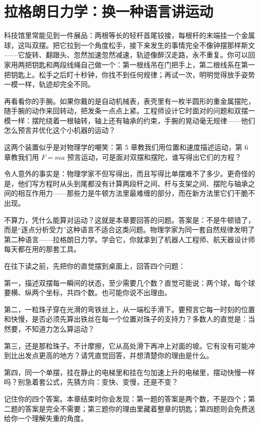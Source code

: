 \chapter{拉格朗日力学：换一种语言讲运动}


\begin{mainline}
科技馆里常能见到一件展品：两根等长的轻杆首尾铰接，每根杆的末端挂一个金属球，这叫双摆。把它拉到一个角度松手，接下来发生的事情完全不像钟摆那样斯文——它旋转、翻跟头、忽然加速忽然减速，轨迹像醉汉走路，永不重复。你可以回家用两把钥匙和两段线绳自己做一个：第一根线吊在门把手上，第二根线系在第一把钥匙上。松手之后盯十秒钟，你找不到任何规律；再试一次，明明觉得放手姿势一模一样，轨迹却完全不同。

再看看你的手腕。如果你戴的是自动机械表，表壳里有一枚半圆形的重金属摆陀，随手腕的动作来回转动，把发条一点点上紧。工程师设计它时面对的问题和双摆一模一样：摆陀绕着一根轴转，轴上还有轴承的约束，手腕的晃动毫无规律——他们怎么预言并优化这个小机器的运动？

这两个装置似乎是对物理学的嘲笑：第 5 章教我们用位置和速度描述运动，第 6 章教我们用 \(F=ma\) 预言运动，可是面对双摆和摆陀，谁写得出它们的方程？

令人意外的事实是：物理学家不但写得出，而且写得比单摆难不了多少。更奇怪的是，他们写方程时从头到尾都没有计算两段杆之间、杆与支架之间、摆陀与轴承之间的相互作用力——那些力是牛顿方法里最难缠的部分，而在新方法里它们干脆不出现。

不算力，凭什么能算对运动？这就是本章要回答的问题。答案是：不是牛顿错了，而是“逐点分析受力”这种语言不适合这类问题。物理学家为同一套自然规律发明了第二种语言——拉格朗日力学。学会它，你就拿到了机器人工程师、航天器设计师每天都在用的那套工具。
\end{mainline}


\begin{mainline}
在往下读之前，先把你的直觉摆到桌面上，回答四个问题：

第一，描述双摆每一瞬间的状态，至少需要几个数？直觉可能说：两个球，每个球要横、纵两个坐标，共四个数。也可能你说不出理由。

第二，一粒珠子穿在光滑的弯铁丝上，从一端松手滑下。要预言它每一时刻的位置和快慢，是否必须先算出铁丝在每一个位置对珠子的支持力？多数人的直觉是：当然要，不知道力怎么算运动？

第三，还是那粒珠子。不计摩擦，它从高处滑下再冲上对面的坡。它有没有可能冲到比出发点更高的地方？请凭直觉回答，并想清楚你的理由是什么。

第四，同一个单摆，挂在静止的电梯里和挂在匀加速上升的电梯里，摆动快慢一样吗？别急着套公式，先猜方向：变快、变慢，还是不变？

记住你的四个答案。本章结束时你会发现：第一题的答案是两个数，不是四个；第二题的答案是完全不需要；第三题你的理由里藏着整章的钥匙；第四题则会免费送给你一个理解失重的角度。
\end{mainline}

